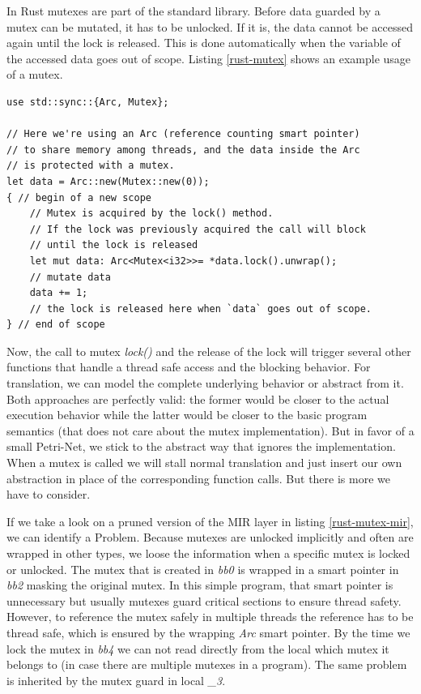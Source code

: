 In Rust mutexes are part of the standard library.
Before data guarded by a mutex can be mutated, it has to be unlocked.
If it is, the data cannot be accessed again until the lock is released.
This is done automatically when the variable of the accessed data goes out of scope.
Listing \ref{rust-mutex} shows an example usage of a mutex.

\begin{lstlisting}
use std::sync::{Arc, Mutex};

// Here we're using an Arc (reference counting smart pointer)
// to share memory among threads, and the data inside the Arc
// is protected with a mutex.
let data = Arc::new(Mutex::new(0));
{ // begin of a new scope
    // Mutex is acquired by the lock() method.
    // If the lock was previously acquired the call will block
    // until the lock is released
    let mut data: Arc<Mutex<i32>>= *data.lock().unwrap();
    // mutate data
    data += 1;
    // the lock is released here when `data` goes out of scope.
} // end of scope
\end{lstlisting}

Now, the call to mutex \textit{lock()} and the release of the lock will trigger several other functions that handle a thread safe access and the blocking behavior.
For translation, we can model the complete underlying behavior or abstract from it.
Both approaches are perfectly valid: the former would be closer to the actual execution behavior while the latter would be closer to the basic program semantics (that does not care about the mutex implementation).
But in favor of a small Petri-Net, we stick to the abstract way that ignores the implementation.
When a mutex is called we will stall normal translation and just insert our own abstraction in place of the corresponding function calls.
But there is more we have to consider.

If we take a look on a pruned version of the MIR layer in listing \ref{rust-mutex-mir}, we can identify a Problem.
Because mutexes are unlocked implicitly and often are wrapped in other types, we loose the information when a specific mutex is locked or unlocked.
The mutex that is created in \textit{bb0} is wrapped in a smart pointer in \textit{bb2} masking the original mutex.
In this simple program, that smart pointer is unnecessary but usually mutexes guard critical sections to ensure thread safety.
However, to reference the mutex safely in multiple threads the reference has to be thread safe, which is ensured by the wrapping \textit{Arc} smart pointer.
By the time we lock the mutex in \textit{bb4} we can not read directly from the local which mutex it belongs to (in case there are multiple mutexes in a program).
The same problem is inherited by the mutex guard in local \textit{\_3}.

